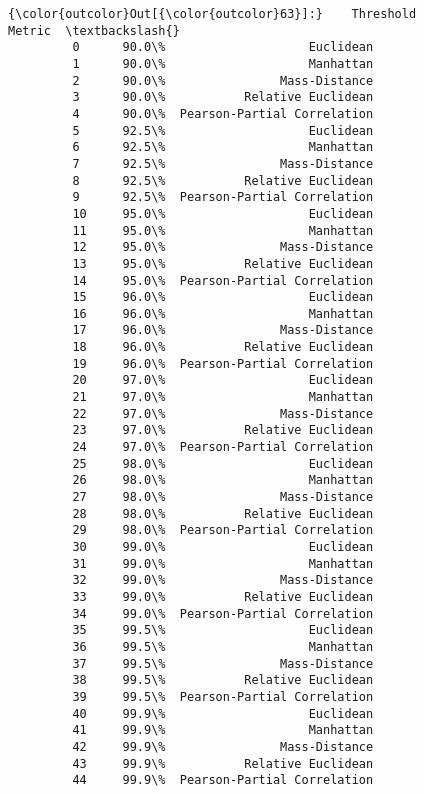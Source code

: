 \documentclass[11pt]{article}
\begin{document}
\begin{Verbatim}[commandchars=\\\{\}]
{\color{outcolor}Out[{\color{outcolor}63}]:}    Threshold                       Metric  \textbackslash{}
         0      90.0\%                    Euclidean   
         1      90.0\%                    Manhattan   
         2      90.0\%                Mass-Distance   
         3      90.0\%           Relative Euclidean   
         4      90.0\%  Pearson-Partial Correlation   
         5      92.5\%                    Euclidean   
         6      92.5\%                    Manhattan   
         7      92.5\%                Mass-Distance   
         8      92.5\%           Relative Euclidean   
         9      92.5\%  Pearson-Partial Correlation   
         10     95.0\%                    Euclidean   
         11     95.0\%                    Manhattan   
         12     95.0\%                Mass-Distance   
         13     95.0\%           Relative Euclidean   
         14     95.0\%  Pearson-Partial Correlation   
         15     96.0\%                    Euclidean   
         16     96.0\%                    Manhattan   
         17     96.0\%                Mass-Distance   
         18     96.0\%           Relative Euclidean   
         19     96.0\%  Pearson-Partial Correlation   
         20     97.0\%                    Euclidean   
         21     97.0\%                    Manhattan   
         22     97.0\%                Mass-Distance   
         23     97.0\%           Relative Euclidean   
         24     97.0\%  Pearson-Partial Correlation   
         25     98.0\%                    Euclidean   
         26     98.0\%                    Manhattan   
         27     98.0\%                Mass-Distance   
         28     98.0\%           Relative Euclidean   
         29     98.0\%  Pearson-Partial Correlation   
         30     99.0\%                    Euclidean   
         31     99.0\%                    Manhattan   
         32     99.0\%                Mass-Distance   
         33     99.0\%           Relative Euclidean   
         34     99.0\%  Pearson-Partial Correlation   
         35     99.5\%                    Euclidean   
         36     99.5\%                    Manhattan   
         37     99.5\%                Mass-Distance   
         38     99.5\%           Relative Euclidean   
         39     99.5\%  Pearson-Partial Correlation   
         40     99.9\%                    Euclidean   
         41     99.9\%                    Manhattan   
         42     99.9\%                Mass-Distance   
         43     99.9\%           Relative Euclidean   
         44     99.9\%  Pearson-Partial Correlation   
         

\end{Verbatim}
\end{document}
